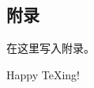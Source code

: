 \renewcommand{\thechapter}{附录\Alph{chapter}.}
\appendix
\begin{appendix}

\chapter{附录}
\songti
在这里写入附录。

Happy TeXing!
\end{appendix}